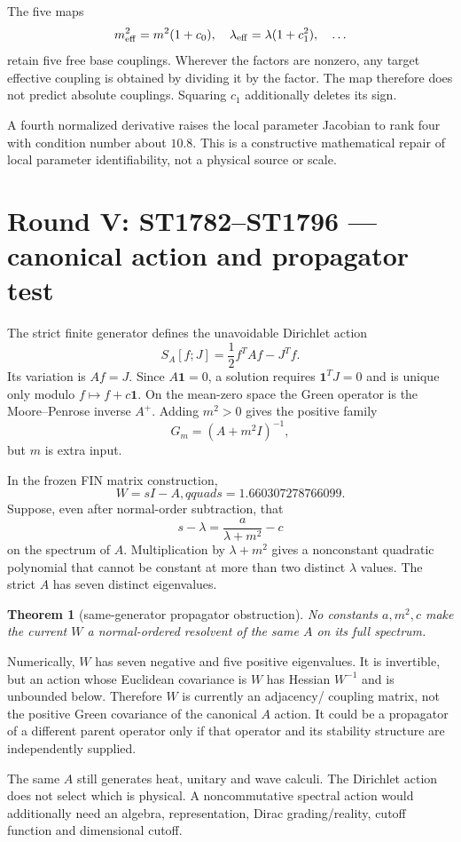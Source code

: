 \documentclass[11pt,a4paper]{article}
\newtheorem{theorem}{Theorem}\newcommand{\status}[1]{\textsf{[#1]}}
\begin{document}
The five maps
\[
m^2_{\rm eff}=m^2(1+c_0),\quad
\lambda_{\rm eff}=\lambda(1+c_1^2),\quad\ldots
\]
retain five free base couplings.  Wherever the factors are nonzero, any target
effective coupling is obtained by dividing it by the factor.  The map therefore
does not predict absolute couplings.  Squaring $c_1$ additionally deletes its
sign.

A fourth normalized derivative raises the local parameter Jacobian to rank
four with condition number about $10.8$.  This is a constructive mathematical
repair of local parameter identifiability, not a physical source or scale.

\section{Round V: ST1782--ST1796 --- canonical action and propagator test}

The strict finite generator defines the unavoidable Dirichlet action
\[
S_A[f;J]=\frac12f^TAf-J^Tf.
\]
Its variation is $Af=J$.  Since $A\mathbf1=0$, a solution requires
$\mathbf1^TJ=0$ and is unique only modulo $f\mapsto f+c\mathbf1$.  On the
mean-zero space the Green operator is the Moore--Penrose inverse $A^+$.
Adding $m^2>0$ gives the positive family
\[
G_m=(A+m^2I)^{-1},
\]
but $m$ is extra input.

In the frozen FIN matrix construction,
\[
W=sI-A,qquad s=1.660307278766099.
\]
Suppose, even after normal-order subtraction, that
\[
s-\lambda=\frac a{\lambda+m^2}-c
\]
on the spectrum of $A$.  Multiplication by $\lambda+m^2$ gives a nonconstant
quadratic polynomial that cannot be constant at more than two distinct
$\lambda$ values.  The strict $A$ has seven distinct eigenvalues.

\begin{theorem}[same-generator propagator obstruction]
No constants $a,m^2,c$ make the current $W$ a normal-ordered resolvent of the
same $A$ on its full spectrum.
\end{theorem}

Numerically, $W$ has seven negative and five positive eigenvalues.  It is
invertible, but an action whose Euclidean covariance is $W$ has Hessian
$W^{-1}$ and is unbounded below.  Therefore $W$ is currently an adjacency/
coupling matrix, not the positive Green covariance of the canonical $A$
action.  It could be a propagator of a different parent operator only if that
operator and its stability structure are independently supplied.

The same $A$ still generates heat, unitary and wave calculi.  The Dirichlet
action does not select which is physical.  A noncommutative spectral action
would additionally need an algebra, representation, Dirac grading/reality,
cutoff function and dimensional cutoff.
\end{document}
